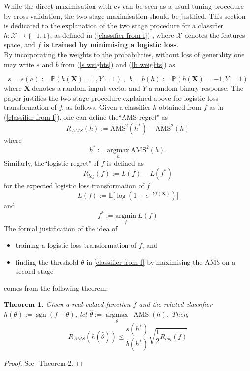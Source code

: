 \documentclass[]{article}
\newtheorem{theorem}{Theorem}[section]
\begin{document}
While the direct maximisation with cv can be seen as a usual tuning procedure by cross validation, the two-stage maximisation should be justified. This section is dedicated to the explanation of the two stage procedure for a  classifier $h:\mathcal{X}\to \{-1,1\}$, as defined in (\ref{classifier from f}) , where $\mathcal{X}$ denotes the features space, and \textbf{$f$ is trained by minimising a logistic loss}.\\

By incorporating the weights to the probabilities, without loss of generality one may write  $s$ and $b$ from (\ref{s weights}) and (\ref{b weights}) as

$$s=s(h):=\mathbb{P}(h(\bm{X})=1,Y=1) \ \text{,} \ \ \ b=b(h):=\mathbb{P}(h(\bm{X})=-1,Y=1)$$
where $\bm{X}$ denotes a random imput vector and $Y$ a random binary response. The paper justifies the two stage procedure explained above for logistic loss transformation of $f$, as follows. Given a classifier $h$ obtained from $f$ as in (\ref{classifier from f}), one can define the``AMS regret" as
\begin{equation}
\label{regret}
R_{AMS}(h):= \text{AMS}^2(h^*)-\text{AMS}^2(h)
\end{equation}
where $$h^*:=\underset{h}{\text{argmax}} \ \text{AMS}^2(h).$$
Similarly, the``logistic regret" of $f$ is defined as
\begin{equation}
\label{logistic regret}
R_{log}(f):= L(f)-L(f^*)
\end{equation}
for the expected logistic loss transformation of $f$ 
\begin{equation}
\label{eq: logloss}
L(f):=\mathbb{E}\Big[\log(1+e^{-Yf(\bm{X})})\Big]
\end{equation}
and $$f^*:=\underset{f}{\text{argmin}} \ L(f)$$
The formal justification of the idea of 
\begin{itemize}
\item training a logistic loss transformation of $f$, and
\item finding the threshold $\theta$ in \ref{classifier from f} by maximising the AMS on a second stage
\end{itemize}
comes from the following theorem.

\begin{theorem}
\label{thm: two stage maximisation}
Given a real-valued function $f$ and the related classifier $h(\theta):=\operatorname{sgn}(f-\theta)$,  let $\hat{\theta}:=\underset{\theta}{\operatorname{argmax}} \ \operatorname{AMS}(h)$. Then,
\begin{equation}
\label{regret inequality}
R_{AMS}(h(\hat{\theta}))\leq \frac{s(h^*)}{b(h^*)}\sqrt{\frac{1}{2}R_{log}(f)}
\end{equation}

\end{theorem}
\begin{proof}
 See \cite{kotlowski2014consistent}-Theorem 2.
\end{proof}
\end{document}
